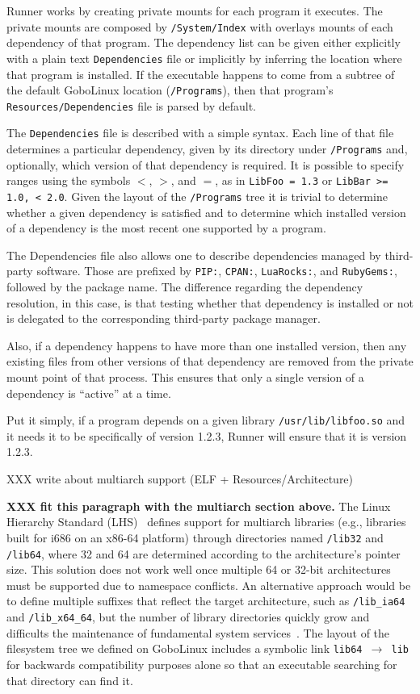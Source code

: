 \documentclass[sigplan, anonymous, 10pt]{acmart}
\begin{document}
Runner works by creating private mounts for each program it executes. The
private mounts are composed by \texttt{/Sys\-tem/Index} with overlays mounts
of each dependency of that program. The dependency list can be given either
explicitly with a plain text \texttt{Dependencies} file or implicitly by
inferring the location where that program is installed. If the executable
happens to come from a subtree of  the default GoboLinux location
(\texttt{/Programs}), then that program's \texttt{Resources/Dependencies}
file is parsed by default.

The \texttt{Dependencies} file is described with a simple syntax. Each line of that file determines
a particular dependency, given by its directory under \texttt{/Programs} and, optionally,
which version of that dependency is required. It is possible to specify ranges using the
symbols $<$, $>$, and $=$, as in \texttt{LibFoo = 1.3} or \texttt{LibBar >= 1.0, < 2.0}.
Given the layout of the \texttt{/Programs} tree it is trivial to determine whether a given
dependency is satisfied and to determine which installed version of a dependency is the most
recent one supported by a program.

The Dependencies file also allows one to describe dependencies managed by third-party
software. Those are prefixed by \texttt{PIP:}, \texttt{CPAN:}, \texttt{LuaRocks:}, and
\texttt{RubyGems:}, followed by the package name. The difference regarding the dependency
resolution, in this case, is that testing whether that dependency is installed or not is
delegated to the corresponding third-party package manager.

Also, if a dependency happens to have more than
one installed version, then any existing files from other versions of that
dependency are removed from the private mount point of that process. This
ensures that only a single version of a dependency is ``active'' at a time.

Put it simply, if a program depends on a given library \texttt{/usr/lib/lib\-foo.so} and it
needs it to be specifically of version 1.2.3, Runner will ensure that it is
version 1.2.3.

XXX write about multiarch support (ELF + Resources/Architecture)
\lipsum[7]

\textbf{XXX fit this paragraph with the multiarch section above.}
The Linux Hierarchy Standard (LHS)~\cite{lsb2015:fhs} defines support for
multiarch libraries (e.g., libraries built for i686 on an x86-64 platform)
through directories named \texttt{/lib32} and \texttt{/lib64},
where 32 and 64 are determined according to the architecture's pointer size.
This solution does not work well once multiple 64 or 32-bit architectures must
be supported due to namespace conflicts. An alternative approach would be to define
multiple suffixes that reflect the target architecture, such as \texttt{/lib\_ia64}
and \texttt{/lib\_x64\_64}, but the number of library directories quickly grow and
difficults the maintenance of fundamental system services~\cite{heen2005:thesis}.
The layout of the filesystem tree we defined on GoboLinux includes a symbolic link
\texttt{lib64 $\rightarrow$ lib} for backwards compatibility purposes alone so that
an executable searching for that directory can find it.
\end{document}

